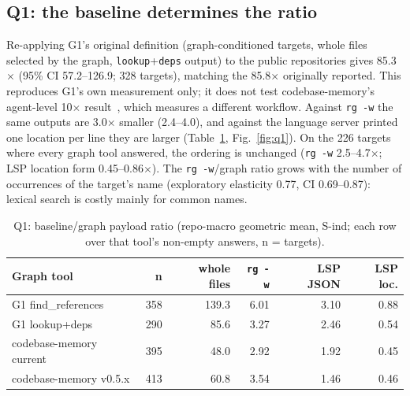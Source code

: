 \documentclass[conference]{IEEEtran}
\newcommand{\rg}{\texttt{rg\,-w}\xspace}
\newcommand{\cbm}{codebase-memory\xspace}
\begin{document}
\subsection{Q1: the baseline determines the ratio}
Re-applying G1's original definition (graph-conditioned targets, whole files selected by the graph, \texttt{lookup}+\texttt{deps} output) to the public repositories gives 85.3$\times$ (95\% CI 57.2--126.9; 328 targets), matching the 85.8$\times$ originally reported.
This reproduces G1's own measurement only; it does not test \cbm's agent-level 10$\times$ result~\cite{codebasememory}, which measures a different workflow.
Against \rg the same outputs are 3.0$\times$ smaller (2.4--4.0), and against the language server printed one location per line they are larger (Table~\ref{tab:q1}, Fig.~\ref{fig:q1}).
On the 226 targets where every graph tool answered, the ordering is unchanged (\rg 2.5--4.7$\times$; LSP location form 0.45--0.86$\times$).
The \rg/graph ratio grows with the number of occurrences of the target's name (exploratory elasticity 0.77, CI 0.69--0.87): lexical search is costly mainly for common names.

\begin{table}[t]
\centering
\caption{Q1: baseline/graph payload ratio (repo-macro geometric mean, S-ind; each row over that tool's non-empty answers, n = targets).}
\label{tab:q1}
\setlength{\tabcolsep}{2.6pt}
\begin{tabular}{@{}lrrrrr@{}}
\toprule
Graph tool & n & whole files & \rg & LSP JSON & LSP loc.\\
\midrule
G1 find\_references & 358 & 139.3 & 6.01 & 3.10 & 0.88\\
G1 lookup+deps & 290 & 85.6 & 3.27 & 2.46 & 0.54\\
\cbm current & 395 & 48.0 & 2.92 & 1.92 & 0.45\\
\cbm v0.5.x & 413 & 60.8 & 3.54 & 1.46 & 0.46\\
\bottomrule
\end{tabular}
\vspace{-1em}
\end{table}
\end{document}
